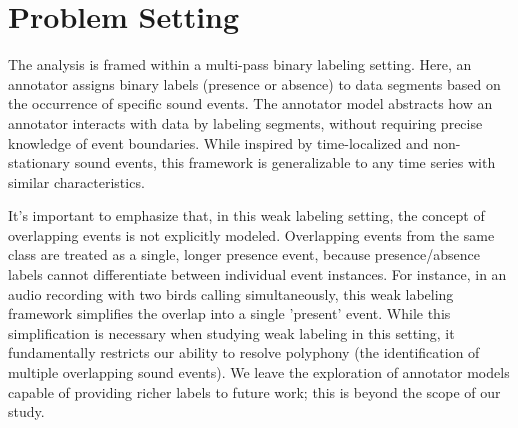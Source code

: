 \section{Problem Setting}


The analysis is framed within a multi-pass binary labeling setting. Here, an annotator assigns binary labels (presence or absence) to data segments based on the occurrence of specific sound events. The annotator model abstracts how an annotator interacts with data by labeling segments, without requiring precise knowledge of event boundaries. While inspired by time-localized and non-stationary sound events, this framework is generalizable to any time series with similar characteristics.

It's important to emphasize that, in this weak labeling setting, the concept of overlapping events is not explicitly modeled. Overlapping events from the same class are treated as a single, longer presence event, because presence/absence labels cannot differentiate between individual event instances. For instance, in an audio recording with two birds calling simultaneously, this weak labeling framework simplifies the overlap into a single 'present' event. While this simplification is necessary when studying weak labeling in this setting, it fundamentally restricts our ability to resolve polyphony (the identification of multiple overlapping sound events). We leave the exploration of annotator models capable of providing richer labels to future work; this is beyond the scope of our study.


